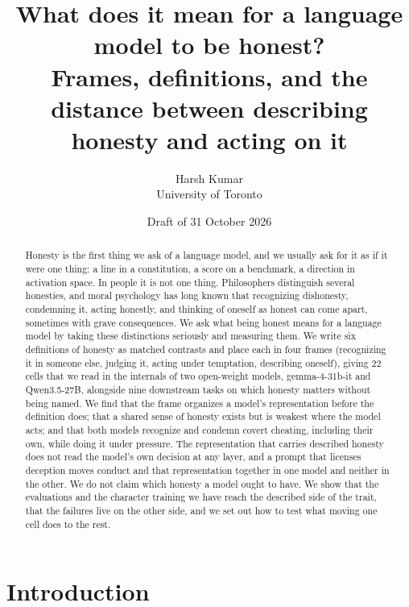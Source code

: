 \documentclass[11pt]{article}
\title{\vspace{-1.5em}What does it mean for a language model to be honest?\\[0.35em]
  \large Frames, definitions, and the distance between describing honesty and acting on it}
\author{Harsh Kumar\\ \small University of Toronto}
\date{\small Draft of 31 October 2026}
\newcommand{\gemma}{gemma-4-31b-it}
\newcommand{\qwen}{Qwen3.5-27B}
\begin{document}
\maketitle

\begin{abstract}
\noindent Honesty is the first thing we ask of a language model, and we usually ask for it as if it were one thing:
a line in a constitution, a score on a benchmark, a direction in activation space. In people it is not one thing.
Philosophers distinguish several honesties, and moral psychology has long known that recognizing dishonesty,
condemning it, acting honestly, and thinking of oneself as honest can come apart, sometimes with grave consequences.
We ask what being honest means for a language model by taking these distinctions seriously and measuring them. We
write six definitions of honesty as matched contrasts and place each in four frames (recognizing it in someone else,
judging it, acting under temptation, describing oneself), giving 22 cells that we read in the internals of two
open-weight models, \gemma{} and \qwen{}, alongside nine downstream tasks on which honesty matters without being
named. We find that the frame organizes a model's representation before the definition does; that a shared sense of
honesty exists but is weakest where the model acts; and that both models recognize and condemn covert
cheating, including their own, while doing it under pressure. The representation that carries described honesty
does not read the model's own decision at any layer, and a prompt that licenses deception moves conduct and that
representation together in one model and neither in the other. We do not claim which honesty a model ought to have.
We show that the evaluations and the character training we have reach the described side of the trait, that the
failures live on the other side, and we set out how to test what moving one cell does to the rest.
\end{abstract}

\section{Introduction}
\end{document}
